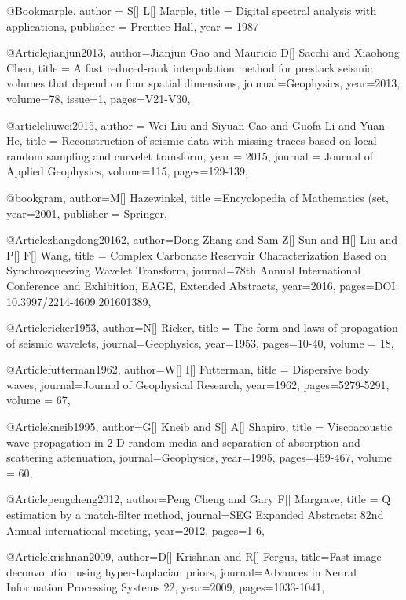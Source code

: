 @Book{marple,
  author = 	 {S[] L[] Marple},
  title = 	 {Digital spectral analysis with applications},
  publisher = 	 {Prentice-Hall},
  year = 	 1987}
  
@Article{jianjun2013,
  author={Jianjun Gao and Mauricio D[] Sacchi and Xiaohong Chen},
  title = {A fast reduced-rank interpolation method for prestack seismic volumes that depend on four spatial dimensions},
  journal={Geophysics},
  year=2013,
  volume=78,
    issue=1,
  pages={V21-V30},
}

@article{liuwei2015,
  author =	 {Wei Liu and Siyuan Cao and Guofa Li and Yuan He},
  title =	 {Reconstruction of seismic data with missing traces based on local random sampling and curvelet transform},
  year =	 2015,
  journal =	 {Journal of Applied Geophysics},
  volume={115},
 pages=129-139,
}

@book{gram,
  author={M[] Hazewinkel},
  title ={Encyclopedia of Mathematics (set},
  year=2001,
  publisher = {Springer},
}


@Article{zhangdong20162,
  author={Dong Zhang and Sam Z[] Sun and H[] Liu and P[] F[] Wang},
  title = {Complex Carbonate Reservoir Characterization Based on Synchrosqueezing Wavelet Transform},
  journal={78th Annual International Conference and Exhibition, EAGE, Extended Abstracts},
  year=2016,
  pages={DOI: 10.3997/2214-4609.201601389},
}






@Article{ricker1953,
  author={N[] Ricker},
  title = {The form and laws of propagation of seismic wavelets},
  journal={Geophysics},
  year=1953,
  pages={10-40},
  volume = 18,
}

@Article{futterman1962,
  author={W[] I[] Futterman},
  title = {Dispersive body waves},
  journal={Journal of Geophysical Research},
  year=1962,
  pages={5279-5291},
  volume = 67,
}

@Article{kneib1995,
  author={G[] Kneib and S[] A[] Shapiro},
  title = {Viscoacoustic wave propagation in 2-D random media and separation of absorption and scattering attenuation},
  journal={Geophysics},
  year=1995,
  pages={459-467},
  volume = 60,
}

@Article{pengcheng2012,
  author={Peng Cheng and Gary F[] Margrave},
  title = {Q estimation by a match-filter method},
  journal={SEG Expanded Abstracts: 82nd Annual international meeting},
  year=2012,
  pages={1-6},
}

@Article{krishnan2009,
  author={D[] Krishnan and R[] Fergus},
  title={Fast image deconvolution using hyper-Laplacian priors},
  journal={Advances in Neural Information Processing Systems 22},
  year=2009,
  pages={1033-1041},
}

